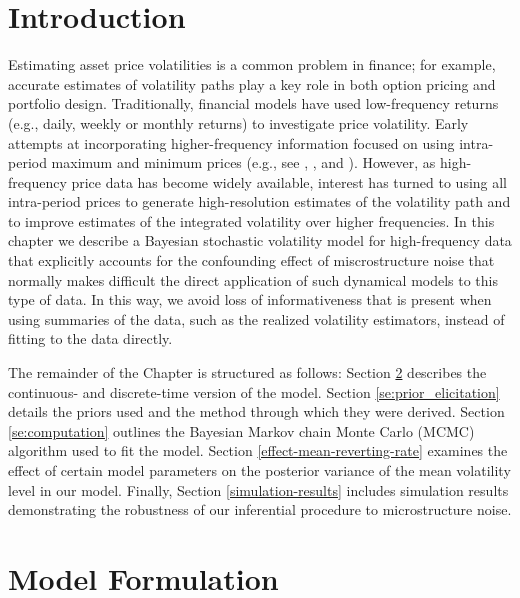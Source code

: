 \label{ch:sv-high-freq}

\section{Introduction}\label{se:introduction}

Estimating asset price volatilities is a common problem in finance; for example, accurate estimates of volatility paths play a key role in both option pricing and portfolio design.  Traditionally, financial models have used low-frequency returns (e.g., daily, weekly or monthly returns) to investigate price volatility.  Early attempts at incorporating higher-frequency information focused on using intra-period maximum and minimum prices (e.g., see \cite{alizadeh2002range}, \cite{brandt2003no-arb}, and \cite{chou2010range}).  However, as high-frequency price data has become widely available, interest has turned to using all intra-period prices to generate high-resolution estimates of the volatility path and to improve estimates of the integrated volatility over higher frequencies. In this chapter we describe a Bayesian stochastic volatility model for high-frequency data that explicitly accounts for the confounding effect of miscrostructure noise that normally makes difficult the direct application of such dynamical models to this type of data. In this way, we avoid loss of informativeness that is present when using summaries of the data, such as the realized volatility estimators, instead of fitting to the data directly.

The remainder of the Chapter is structured as follows:  Section \ref{se:model_formulation} describes the continuous- and discrete-time version of the model. Section \ref{se:prior_elicitation} details the priors used and the method through which they were derived. Section \ref{se:computation} outlines the Bayesian Markov chain Monte Carlo (MCMC) algorithm used to fit the model. Section \ref{effect-mean-reverting-rate} examines the effect of certain model parameters on the posterior variance of the mean volatility level in our model. Finally, Section \ref{simulation-results} includes simulation results demonstrating the robustness of our inferential procedure to microstructure noise.

\section{Model Formulation}\label{se:model_formulation}

